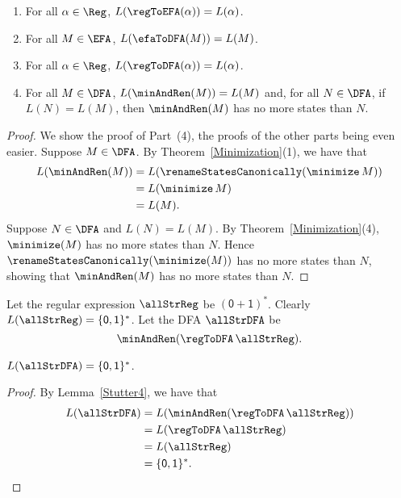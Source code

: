 \begin{lemma}
\label{Stutter4}
\begin{enumerate}[\quad(1)]
\item For all $\alpha\in\Reg$, $L(\regToEFA(\alpha))=L(\alpha)$.

\item For all $M\in\EFA$, $L(\efaToDFA(M)) = L(M)$.

\item For all $\alpha\in\Reg$, $L(\regToDFA(\alpha)) = L(\alpha)$.

\item For all $M\in\DFA$, $L(\minAndRen(M)) = L(M)$ and,
for all $N\in\DFA$, if $L(N)=L(M)$, then $\minAndRen(M)$ has no more
states than $N$.
\end{enumerate}
\end{lemma}

\begin{proof}
We show the proof of Part~(4), the proofs of the other parts being
even easier.  Suppose $M\in\DFA$.  By Theorem~\ref{Minimization}(1), we
have that
\begin{align*}
L(\minAndRen(M)) &= L(\renameStatesCanonically(\minimize\,M)) \\
                 &= L(\minimize\,M) \\
                 &= L(M) .
\end{align*}
Suppose $N\in\DFA$ and $L(N)=L(M)$.  By Theorem~\ref{Minimization}(4),
$\minimize(M)$ has no more states than $N$.
Hence $\renameStatesCanonically(\minimize(M))$ has no more states than $N$,
showing that $\minAndRen(M)$ has no more states than $N$.
\end{proof}

Let the regular expression $\allStrReg$ be $\mathsf{(0+1)^*}$.
Clearly $L(\allStrReg)=\{\mathsf{0,1}\}^*$.  Let the DFA
$\allStrDFA$ be
\begin{displaymath}
\minAndRen(\regToDFA\,\allStrReg) .
\end{displaymath}

\begin{lemma}
\label{Stutter5}
$L(\allStrDFA)=\{\mathsf{0,1}\}^*$.
\end{lemma}

\begin{proof}
By Lemma~\ref{Stutter4}, we have that
\begin{align*}
L(\allStrDFA) &= L(\minAndRen(\regToDFA\,\allStrReg)) \\
              &= L(\regToDFA\,\allStrReg) \\
              &= L(\allStrReg) \\
              &= \{\mathsf{0,1}\}^* .
\end{align*}
\end{proof}

